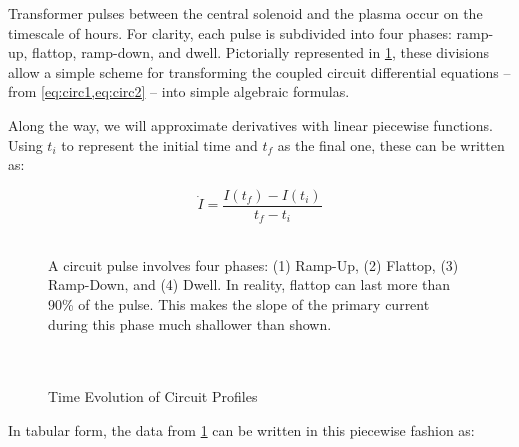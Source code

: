 Transformer pulses between the central solenoid and the plasma occur on the timescale of hours.  For clarity, each pulse is subdivided into four phases: ramp-up, flattop, ramp-down, and dwell. Pictorially represented in \cref{fig:circuit_profiles}, these divisions allow a simple scheme for transforming the coupled circuit differential equations -- from \cref{eq:circ1,eq:circ2} -- into simple algebraic formulas.

Along the way, we will approximate derivatives with linear piecewise functions. Using $t_i$ to represent the initial time and $t_f$ as the final one, these can be written as:

\begin{equation}
	\dot I = \frac{ I(t_f) - I(t_i) }{t_f - t_i}
\end{equation}

\newpage

\begin{figure}[b!]
\centering

\caption{Time Evolution of Circuit Profiles}
\label{fig:circuit_profiles} ~\\
\small{A circuit pulse involves four phases: (1) Ramp-Up, (2) Flattop, (3) Ramp-Down, and (4) Dwell. In reality, flattop can last more than 90\% of the pulse.\cite{inputfile} This makes the slope of the primary current during this phase much shallower than shown. } ~ \\ ~ \\ ~ \\
\end{figure}

In tabular form, the data from \cref{fig:circuit_profiles} can be written in this piecewise fashion as:

